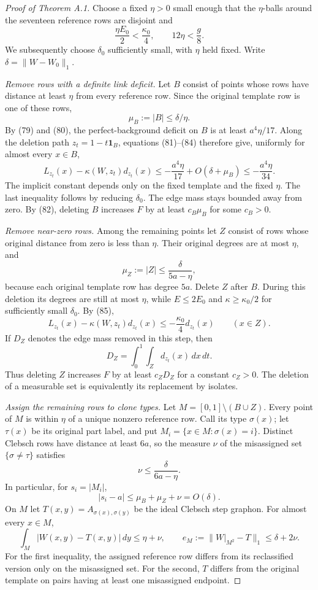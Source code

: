 \documentclass[11pt]{amsart}
\theoremstyle{definition}
\theoremstyle{remark}
\begin{document}
\begin{proof}[Proof of Theorem A.1]
Choose a fixed $\eta>0$ small enough that the $\eta$-balls around
the seventeen reference rows are disjoint and
\[
 \frac{\eta E_0}{2}<\frac{\kappa_0}{4},\qquad
 12\eta<\frac g8.
\]
We subsequently choose $\delta_0$ sufficiently small, with $\eta$
held fixed. Write $\delta=\lVert W-W_0\rVert_1$.

\emph{Remove rows with a definite link deficit.} Let $B$ consist of
points whose rows have distance at least $\eta$ from every reference
row. Since the original template row is one of these rows,
\[
 \mu_B:=|B|\leq\delta/\eta.
\]
By (79) and (80), the perfect-background deficit on $B$ is at least
$a^4\eta/17$. Along the deletion path $z_t=1-t\mathbf1_B$,
equations (81)--(84) therefore give, uniformly for almost every
$x\in B$,
\[
 L_{z_t}(x)-\kappa(W,z_t)d_{z_t}(x)
 \leq-\frac{a^4\eta}{17}+O(\delta+\mu_B)
 \leq-\frac{a^4\eta}{34}.
\]
The implicit constant depends only on the fixed template and the
fixed $\eta$. The last inequality follows by reducing $\delta_0$.
The edge mass stays bounded away from zero. By (82), deleting $B$
increases $F$ by at least $c_B\mu_B$ for some $c_B>0$.

\emph{Remove near-zero rows.} Among the remaining points let $Z$
consist of rows whose original distance from zero is less than $\eta$.
Their original degrees are at most $\eta$, and
\[
 \mu_Z:=|Z|\leq\frac\delta{5a-\eta},
\]
because each original template row has degree $5a$. Delete $Z$ after
$B$. During this deletion its degrees are still at most $\eta$, while
$E\leq2E_0$ and $\kappa\geq\kappa_0/2$ for sufficiently small
$\delta_0$. By (85),
\[
 L_{z_t}(x)-\kappa(W,z_t)d_{z_t}(x)
 \leq-\frac{\kappa_0}{4}d_{z_t}(x)\qquad(x\in Z).
\]
If $D_Z$ denotes the edge mass removed in this step, then
\[
 D_Z=\int_0^1\int_Z d_{z_t}(x)\,dx\,dt.
\]
Thus deleting $Z$ increases $F$ by at least $c_ZD_Z$ for a constant
$c_Z>0$. The deletion of a measurable set is equivalently its
replacement by isolates.

\emph{Assign the remaining rows to clone types.} Let
$M=[0,1]\setminus(B\cup Z)$. Every point of $M$ is within $\eta$ of
a unique nonzero reference row. Call its type $\sigma(x)$; let
$\tau(x)$ be its original part label, and put
$M_i=\{x\in M:\sigma(x)=i\}$. Distinct Clebsch rows have distance
at least $6a$, so the measure $\nu$ of the misassigned set
$\{\sigma\ne\tau\}$ satisfies
\[
 \nu\leq\frac\delta{6a-\eta}.
\]
In particular, for $s_i=|M_i|$,
\begin{equation}\tag{89}\label{eq:reclassified-masses}
 |s_i-a|\leq\mu_B+\mu_Z+\nu=O(\delta).
\end{equation}
On $M$ let $T(x,y)=A_{\sigma(x),\sigma(y)}$ be the ideal Clebsch
step graphon. For almost every $x\in M$,
\begin{equation}\tag{90}\label{eq:reclassified-errors}
 \int_M|W(x,y)-T(x,y)|\,dy\leq\eta+\nu,\qquad
 e_M:=\lVert W|_{M^2}-T\rVert_1\leq\delta+2\nu.
\end{equation}
For the first inequality, the assigned reference row differs from its
reclassified version only on the misassigned set. For the second, $T$
differs from the original template on pairs having at least one
misassigned endpoint.


\end{proof}
\end{document}
